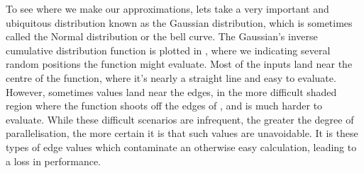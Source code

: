 \documentclass[11pt,a4paper,twoside,english]{extarticle}
\begin{document}
To see where we make our approximations, lets take a very important and ubiquitous distribution known as the Gaussian distribution, which is sometimes called the Normal distribution or the bell curve. The Gaussian's inverse cumulative distribution function is plotted in ,
where we indicating several random positions the function might evaluate. Most of the inputs land near the centre of the function, where it's nearly a straight line and easy to evaluate. However, sometimes values land near the edges, in the more difficult shaded region where the function shoots off the edges of , and is much harder to evaluate. While these difficult scenarios are infrequent, the greater the degree of parallelisation, the more certain it is that such values are unavoidable. It is these types of edge values which contaminate an otherwise easy calculation, leading to a loss in performance. 
\end{document}
